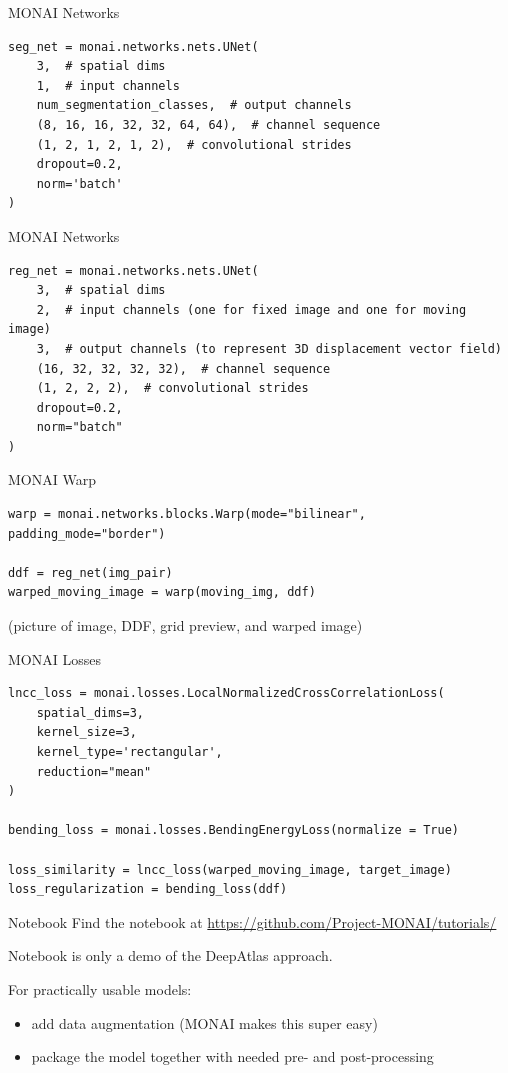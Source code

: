 \documentclass[10pt,aspectratio=169,dvipsnames]{beamer}
\begin{document}
\begin{frame}[fragile]{MONAI Networks}
\begin{verbatim}
seg_net = monai.networks.nets.UNet(
	3,  # spatial dims
	1,  # input channels
	num_segmentation_classes,  # output channels
	(8, 16, 16, 32, 32, 64, 64),  # channel sequence
	(1, 2, 1, 2, 1, 2),  # convolutional strides
	dropout=0.2,
	norm='batch'
)
\end{verbatim}
\end{frame}

\begin{frame}[fragile]{MONAI Networks}
\begin{verbatim}
reg_net = monai.networks.nets.UNet(
	3,  # spatial dims
	2,  # input channels (one for fixed image and one for moving image)
	3,  # output channels (to represent 3D displacement vector field)
	(16, 32, 32, 32, 32),  # channel sequence
	(1, 2, 2, 2),  # convolutional strides
	dropout=0.2,
	norm="batch"
)
\end{verbatim}
\end{frame}

\begin{frame}[fragile]{MONAI Warp}
	\begin{verbatim}
warp = monai.networks.blocks.Warp(mode="bilinear", padding_mode="border")

ddf = reg_net(img_pair)
warped_moving_image = warp(moving_img, ddf)
	\end{verbatim}
\begin{center}
	(picture of image, DDF, grid preview, and warped image)
\end{center}
\end{frame}


\begin{frame}[fragile]{MONAI Losses}
\begin{verbatim}
lncc_loss = monai.losses.LocalNormalizedCrossCorrelationLoss(
	spatial_dims=3,
	kernel_size=3,
	kernel_type='rectangular',
	reduction="mean"
)

bending_loss = monai.losses.BendingEnergyLoss(normalize = True)

loss_similarity = lncc_loss(warped_moving_image, target_image)
loss_regularization = bending_loss(ddf)
\end{verbatim}
\end{frame}



\begin{frame}{Notebook}
Find the notebook at
\url{https://github.com/Project-MONAI/tutorials/}

\vspace{2em}
	
Notebook is only a demo of the DeepAtlas approach.

For practically usable models:
\begin{itemize}
	\item add data augmentation (MONAI makes this super easy)
	\item package the model together with needed pre- and post-processing
\end{itemize}
\end{frame}
\end{document}
